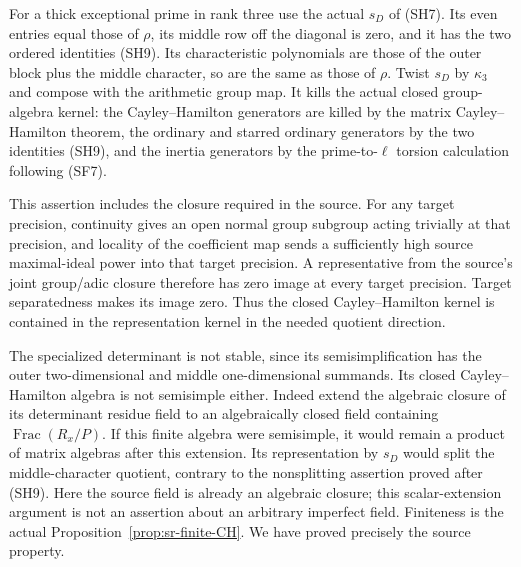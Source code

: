 For a thick exceptional prime in rank three use
the actual \(s_D\) of (SH7).
Its even entries equal those of \(\rho\), its
middle row off the diagonal is zero, and it has
the two ordered identities (SH9).
Its characteristic polynomials are those of the
outer block plus the middle character, so are
the same as those of \(\rho\).
Twist \(s_D\) by \(\kappa_3\) and compose with
the arithmetic group map. It kills the actual
closed group-algebra kernel:
the Cayley--Hamilton generators are killed by
the matrix Cayley--Hamilton theorem, the ordinary
and starred ordinary generators by the two
identities (SH9), and the inertia generators by
the prime-to-\(\ell\) torsion calculation following
(SF7).

This assertion includes the closure required in
the source. For any target precision, continuity
gives an open normal group subgroup acting trivially
at that precision, and locality of the coefficient
map sends a sufficiently high source maximal-ideal
power into that target precision.
A representative from the source's joint
group/adic closure therefore has zero image at
every target precision. Target separatedness
makes its image zero.
Thus the closed Cayley--Hamilton kernel is
contained in the representation kernel in the
needed quotient direction.

The specialized determinant is not stable,
since its semisimplification has the outer
two-dimensional and middle one-dimensional
summands.
Its closed Cayley--Hamilton algebra is not
semisimple either.
Indeed extend the algebraic closure of its
determinant residue field to an algebraically
closed field containing
\(\operatorname{Frac}(R_x/P)\).
If this finite algebra were semisimple, it
would remain a product of matrix algebras after
this extension. Its representation by \(s_D\)
would split the middle-character quotient,
contrary to the nonsplitting assertion proved
after (SH9).
Here the source field is already an algebraic
closure; this scalar-extension argument is not
an assertion about an arbitrary imperfect field.
Finiteness is the actual
Proposition~\ref{prop:sr-finite-CH}.
We have proved precisely the source
 property.

